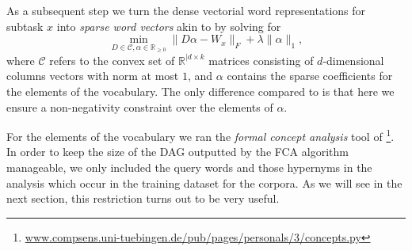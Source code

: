 \documentclass[11pt,a4paper]{article}
\begin{document}
As a subsequent step we turn the dense vectorial word representations for subtask $x$ into
\emph{sparse word vectors} akin to \citet{Berend:2017} by solving for
\begin{equation}
\min\limits_{D \in \mathcal{C}, \alpha \in \mathbb{R}_{\geq0}} \lVert D\alpha - W_{x} \rVert_F + \lambda \lVert \alpha \rVert_1,
\label{nonneg_SPAMS_objective}
\end{equation}
where $\mathcal{C}$ refers to the convex set of $\mathbb{R}^{\lvert d \times k}$ matrices consisting of $d$-dimensional columns vectors
with norm at most $1$, and $\alpha$ contains the sparse coefficients for the elements of the vocabulary. The only difference
compared to \citet{Berend:2017} is that here we ensure a non-negativity
constraint over the elements of $\alpha$.

For the elements of the vocabulary we ran the \emph{formal concept analysis} tool of
\citet{Endres:2010}\footnote{\url{www.compsens.uni-tuebingen.de/pub/pages/personals/3/concepts.py}}. In order to keep the size of the DAG outputted by the FCA algorithm manageable, we only included the query words and those hypernyms in the analysis which occur in the training dataset for the corpora.
As we will see in the next section, this restriction turns out to be very useful.

\end{document}
